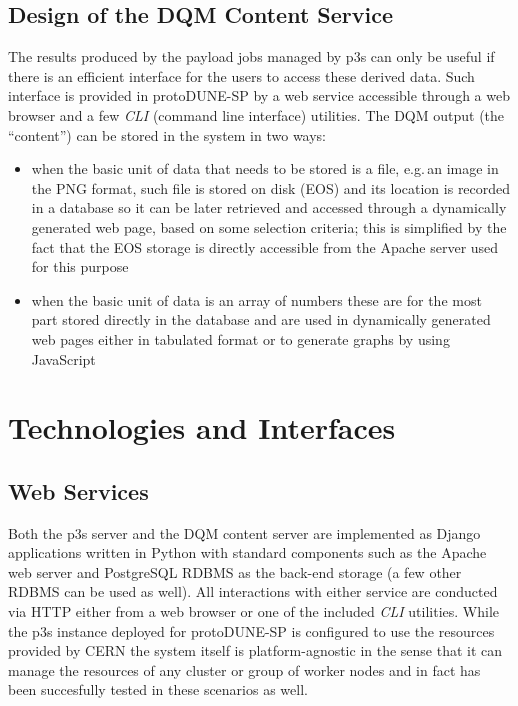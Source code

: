 \documentclass[pdftex,12pt,letter]{article}
\newcommand{\pd}{protoDUNE\xspace}
\begin{document}
\subsection{Design of the DQM Content Service}
The results produced by the payload jobs managed by p3s can only be useful if there is an
efficient interface for the users to access these derived data. Such interface is provided in \pd-SP
by a web service accessible through a web browser and a few \textit{CLI} (command line interface) utilities.
The DQM output (the ``content'') can be stored in the system in two ways:
\begin{itemize}

\item when the basic unit of data that needs to be stored is a file, e.g.\,an image in the PNG format, such
file is stored on disk (EOS) and its location is recorded in a database so it can be later retrieved
and accessed through a dynamically generated web page,  based on some selection criteria; 
this is simplified by the fact that the EOS storage is directly accessible from the Apache server
used for this purpose

\item when the basic unit of data is an array of numbers these are for the most part stored directly
in the database and are used in dynamically generated web pages either in tabulated format or
to generate graphs by using JavaScript

\end{itemize}



\section{Technologies and Interfaces}
\subsection{Web Services}

Both the p3s server and the DQM content server are implemented as Django
\cite{django} applications written in Python with standard components such
as the Apache web server and PostgreSQL RDBMS as the back-end storage
(a few other RDBMS can be used as well). All interactions with either service
are conducted via HTTP either from a web browser or one of the included \textit{CLI} utilities.
While the p3s instance deployed for \pd-SP is configured to use
the resources provided by CERN the system itself is platform-agnostic in the sense that
it can manage the resources of any cluster or group of worker nodes and in fact has
been succesfully tested in these scenarios as well.
\end{document}
